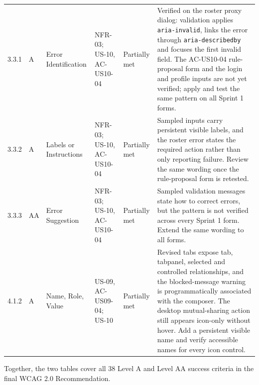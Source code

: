 \documentclass[11pt,a4paper]{article}
\begin{document}
{\begin{longtable}{@{}L{1.1cm}L{0.85cm}L{2.25cm}L{2.35cm}L{1.3cm}L{5.05cm}@{}}
    3.3.1 &
    A &
    Error Identification &
    NFR-03; US-10, AC-US10-04 &
    Partially met &
    Verified on the roster proxy dialog: validation applies
    \texttt{aria-invalid}, links the error through \texttt{aria-describedby}
    and focuses the first invalid field. The AC-US10-04 rule-proposal form and
    the login and profile inputs are not yet verified; apply and test the same
    pattern on all Sprint 1 forms.\\

    3.3.2 &
    A &
    Labels or Instructions &
    NFR-03; US-10, AC-US10-04 &
    Partially met &
    Sampled inputs carry persistent visible labels, and the roster error states
    the required action rather than only reporting failure. Review the same
    wording once the rule-proposal form is retested.\\

    3.3.3 &
    AA &
    Error Suggestion &
    NFR-03; US-10, AC-US10-04 &
    Partially met &
    Sampled validation messages state how to correct errors, but the pattern is
    not verified across every Sprint 1 form. Extend the same wording to all
    forms.\\

    4.1.2 &
    A &
    Name, Role, Value &
    US-09, AC-US09-04; US-10 &
    Partially met &
    Revised tabs expose tab, tabpanel, selected and controlled relationships,
    and the blocked-message warning is programmatically associated with the
    composer. The desktop mutual-sharing action still appears icon-only without
    hover. Add a persistent visible name and verify accessible names for every
    icon control.\\
\end{longtable}
}

Together, the two tables cover all 38 Level A and Level AA success criteria in
the final WCAG 2.0 Recommendation.
\end{document}
